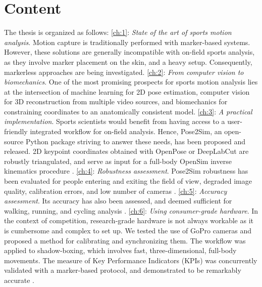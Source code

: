 \newpage
\section*{Content}

The thesis is organized as follows:
\vskip 0.4cm
\noindent\autoref{ch:1}: \emph{State of the art of sports motion analysis}. \newline
Motion capture is traditionally performed with marker-based systems. However, these solutions are generally incompatible with on-field sports analysis, as they involve marker placement on the skin, and a heavy setup. Consequently, markerless approaches are being investigated. 
\vskip 0.4cm
\noindent\autoref{ch:2}: \emph{From computer vision to biomechanics}. \newline
One of the most promising prospects for sports motion analysis lies at the intersection of machine learning for 2D pose estimation, computer vision for 3D reconstruction from multiple video sources, and biomechanics for constraining coordinates to an anatomically consistent model. 
\vskip 0.4cm
\noindent\autoref{ch:3}: \emph{A practical implementation}. \newline
Sports scientists would benefit from having access to a user-friendly integrated workflow for on-field analysis. Hence, Pose2Sim, an open-source Python package striving to answer these needs, has been proposed and released. 2D keypoint coordinates obtained with OpenPose or DeepLabCut are robustly triangulated, and serve as input for a full-body OpenSim inverse kinematics procedure \cite{Pagnon2022b}.
\vskip 0.4cm
\noindent\autoref{ch:4}: \emph{Robustness assessment}. \newline
Pose2Sim robustness has been evaluated for people entering and exiting the field of view, degraded image quality, calibration errors, and low number of cameras \cite{Pagnon2021}. 
\vskip 0.4cm
\noindent\autoref{ch:5}: \emph{Accuracy assessment}. \newline
Its accuracy has also been assessed, and deemed sufficient for walking, running, and cycling analysis \cite{Pagnon2022a}. 
\vskip 0.4cm
\noindent\autoref{ch:6}: \emph{Using consumer-grade hardware}. \newline
In the context of competition, research-grade hardware is not always workable as it is cumbersome and complex to set up. We tested the use of GoPro cameras and proposed a method for calibrating and synchronizing them. The workflow was applied to shadow-boxing, which involves fast, three-dimensional, full-body movements. The measure of Key Performance Indicators (KPIs) was concurrently validated with a marker-based protocol, and demonstrated to be remarkably accurate \cite{Pagnon2022c}.
